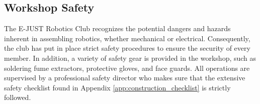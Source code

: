 \subsection{Workshop Safety}

The E-JUST Robotics Club recognizes the potential dangers and hazards inherent in assembling robotics, whether mechanical or electrical. Consequently, the club has put in place strict safety procedures to ensure the security of every member. In addition, a variety of safety gear is provided in the workshop, such as soldering fume extractors, protective gloves, and face guards. All operations are supervised by a professional safety director who makes sure that the extensive safety checklist found in Appendix \ref{app:construction_checklist} is strictly followed.
